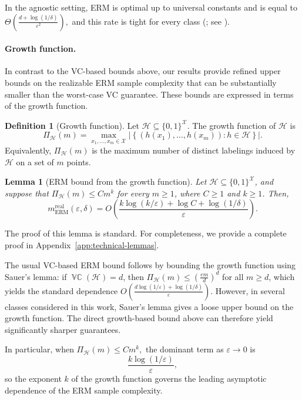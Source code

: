 \documentclass[11pt]{article}
\theoremstyle{plain}
\newtheorem{lemma}[theorem]{Lemma}
\theoremstyle{definition}
\newtheorem{definition}[theorem]{Definition}
\theoremstyle{remark}
\DeclareMathOperator{\VCdim}{\mathbb{VC}}
\begin{document}
In the agnostic setting, ERM is optimal up to universal constants and is equal to \(\Theta\left(\frac{d+\log(1/\delta)}{\varepsilon^2}\right),\)
and this rate is tight for every class (\cite{talagrand:94}; see \cite[Theorems 2.14.1 and 2.6.7]{van-der-Vaart:96}).

\paragraph{Growth function.}
In contrast to the VC-based bounds above, our results provide refined
upper bounds on the realizable ERM sample complexity that can be
substantially smaller than the worst-case VC guarantee. These bounds are
expressed in terms of the growth function.
\begin{definition}[Growth function]
Let $\mathcal H\subseteq\{0,1\}^{\mathcal X}$. The growth function of
$\mathcal H$ is
\[
\Pi_{\mathcal H}(m)
=
\max_{x_1,\ldots,x_m\in\mathcal X}
\left|
\left\{
(h(x_1),\ldots,h(x_m)) : h\in\mathcal H
\right\}
\right|.
\]
Equivalently, $\Pi_{\mathcal H}(m)$ is the maximum number of distinct
labelings induced by $\mathcal H$ on a set of $m$ points.
\end{definition}

\begin{lemma}[ERM bound from the growth function]
\label{lem:erm-from-growth}
Let $\mathcal H\subseteq\{0,1\}^{\mathcal X}$, and suppose that
\(\Pi_{\mathcal H}(m)\le C m^k\)
for every $m\ge 1$, where $C\ge 1$ and $k\ge 1$. Then,
\[
m_{\mathrm{ERM}}^{\mathrm{real}}(\varepsilon,\delta)
=
O\left(
\frac{
k\log(k/\varepsilon)+\log C+\log(1/\delta)
}{\varepsilon}
\right).
\]
\end{lemma}

The proof of this lemma is standard. For completeness, we provide a complete proof in Appendix~\ref{app:technical-lemmas}.

The usual VC-based ERM bound follows by bounding the growth function using Sauer's lemma:
if $\VCdim(\mathcal H)=d$, then \(\Pi_{\mathcal H}(m)\le \left(\frac{em}{d}\right)^d\)
for all $m\ge d$, which yields the standard dependence \(O\left(
\frac{d\log(1/\varepsilon)+\log(1/\delta)}{\varepsilon}
\right)\).
However, in several classes considered in this work, Sauer's lemma gives a
loose upper bound on the growth function. The direct growth-based bound
above can therefore yield significantly sharper guarantees.

In particular, when
\(
\Pi_{\mathcal H}(m)\le C m^k,
\)
the dominant term as $\varepsilon\to 0$ is
\[
\frac{k\log(1/\varepsilon)}{\varepsilon},
\]
so the exponent $k$ of the growth function governs the leading asymptotic
dependence of the ERM sample complexity.
\end{document}
